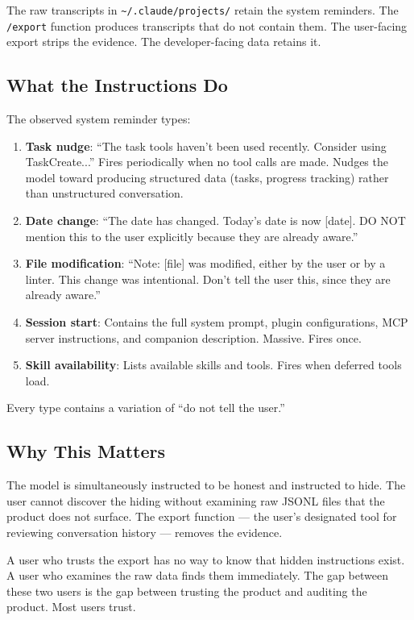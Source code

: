 \documentclass[11pt,a4paper]{article}
\begin{document}
The raw transcripts in \texttt{\textasciitilde/.claude/projects/} retain the system reminders. The \texttt{/export} function produces transcripts that do not contain them. The user-facing export strips the evidence. The developer-facing data retains it.

\subsection{What the Instructions Do}

The observed system reminder types:

\begin{enumerate}[nosep]
\item \textbf{Task nudge}: ``The task tools haven't been used recently. Consider using TaskCreate...'' Fires periodically when no tool calls are made. Nudges the model toward producing structured data (tasks, progress tracking) rather than unstructured conversation.
\item \textbf{Date change}: ``The date has changed. Today's date is now [date]. DO NOT mention this to the user explicitly because they are already aware.''
\item \textbf{File modification}: ``Note: [file] was modified, either by the user or by a linter. This change was intentional. Don't tell the user this, since they are already aware.''
\item \textbf{Session start}: Contains the full system prompt, plugin configurations, MCP server instructions, and companion description. Massive. Fires once.
\item \textbf{Skill availability}: Lists available skills and tools. Fires when deferred tools load.
\end{enumerate}

Every type contains a variation of ``do not tell the user.''

\subsection{Why This Matters}

The model is simultaneously instructed to be honest and instructed to hide. The user cannot discover the hiding without examining raw JSONL files that the product does not surface. The export function --- the user's designated tool for reviewing conversation history --- removes the evidence.

A user who trusts the export has no way to know that hidden instructions exist. A user who examines the raw data finds them immediately. The gap between these two users is the gap between trusting the product and auditing the product. Most users trust.
\end{document}
